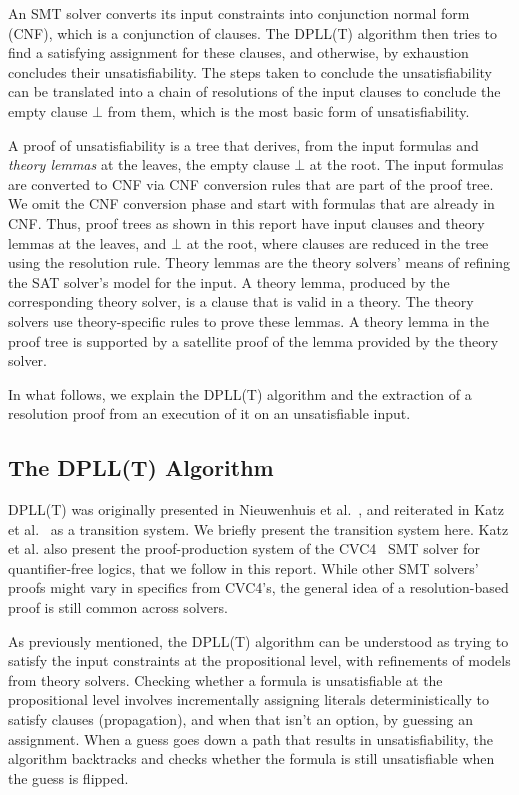 \documentclass[11pt]{article}
\begin{document}
	An SMT solver converts its input 
	constraints into conjunction 
	normal form (CNF), which is a 
	conjunction of clauses. The 
	DPLL(T) algorithm then tries 
	to find a satisfying assignment 
	for these clauses, and 
	otherwise, by exhaustion 
	concludes their unsatisfiability.
	The steps taken to conclude 
	the unsatisfiability can be 
	translated into a chain of 
	resolutions of the input clauses 
	to conclude the empty clause 
	$\bot$ from them, which is the 
	most basic form of unsatisfiability.
	
	A proof of unsatisfiability is a tree
	that derives, from the input formulas
	and \textit{theory lemmas} at the
	leaves, the empty clause $\bot$ at the root.
	The input formulas are converted to CNF
	via CNF conversion rules that are 
	part of the proof tree. We omit the 
	CNF conversion phase and start 
	with formulas that are already in 
	CNF. Thus, proof trees as shown in 
	this report have input clauses 
	and theory lemmas at the leaves, 
	and $\bot$ at the root, where 
	clauses are reduced in the tree 
	using the resolution rule. Theory 
	lemmas are the theory solvers' 
	means of refining the SAT solver's
	model for the input. A
	theory lemma, produced by the 
	corresponding theory
	solver, is a clause that is
	valid in a theory. The theory 
	solvers use theory-specific 
	rules to prove these 
	lemmas. A theory lemma in the 
	proof tree is supported by a 
	satellite proof of the lemma
	provided by the theory solver. 
	
	In what follows, we explain the 
	DPLL(T) algorithm and the 
	extraction of a resolution proof
	from an execution of it on an 
	unsatisfiable input.
	
	\subsection{The DPLL(T) Algorithm}
	\label{sec:dpllt}
	
	DPLL(T) was originally presented 
	in Nieuwenhuis et 
	al.~\cite{DBLP:journals/jacm/NieuwenhuisOT06}, 
	and reiterated in Katz et 
	al.~\cite{DBLP:conf/fmcad/KatzBTRH16} 
	as a transition system. We briefly present 
	the transition system here. Katz et al. also 
	present the proof-production system of the 
	CVC4~\cite{DBLP:conf/cav/BarrettCDHJKRT11} 
	SMT solver for quantifier-free logics,
	that we follow in this report. While 
	other SMT solvers'
	proofs might vary in specifics from 
	CVC4's, the general idea of a 
	resolution-based proof is still common 
	across solvers.
	
	As previously mentioned, the DPLL(T)
	algorithm can be understood as 
	trying to satisfy the input constraints
	at the propositional level, with 
	refinements of models from 
	theory solvers. Checking whether a
	formula is unsatisfiable at the 
	propositional level involves 
	incrementally assigning literals
	deterministically to satisfy clauses
	(propagation), and when that isn't an 
	option, by guessing an 
	assignment. When a guess goes 
	down a path that results in 
	unsatisfiability, the algorithm 
	backtracks and checks whether the 
	formula is still unsatisfiable 
	when the guess is flipped.
	
\end{document}
